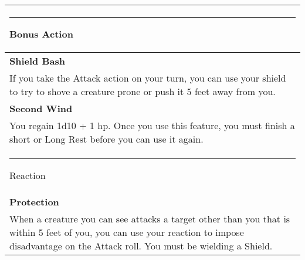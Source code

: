 \documentclass[twocolumn]{article}
\begin{document}
\\
\noindent\begin{tabular}{|m{3.1in}|}
\hline
\rule{1.1in}{0pt}Bonus Action\\
\hline
\textbf{Shield Bash}\\
If you take the Attack action on your turn, you can use your shield to try to shove a creature prone or push it 5 feet away from you.\\
\textbf{Second Wind}\\
You regain 1d10 + 1 hp.
Once you use this feature, you must finish a short or Long Rest before you can use it again. \\
\hline
\rule{1.2in}{0pt}Reaction\\
\hline
\textbf{Protection}\\
When a creature you can see attacks a target other than you that is within 5 feet of you, you can use your reaction to impose disadvantage on the Attack roll. You must be wielding a Shield.\\
\hline
\end{tabular}
\end{document}
